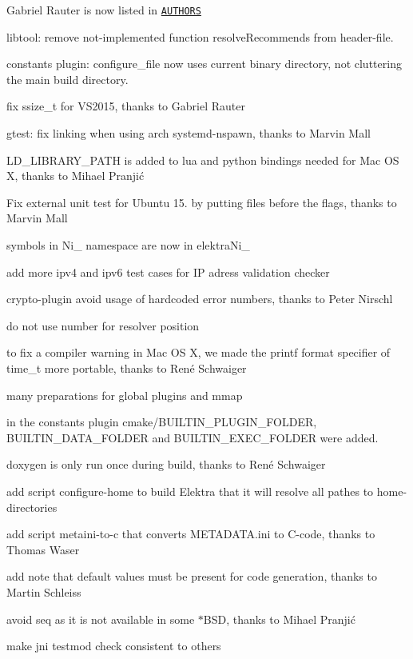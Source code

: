 \begin{DoxyItemize}
\item Gabriel Rauter is now listed in \href{https://github.com/elektrainitiative/libelektra/tree/doc/AUTHORS}{\tt A\+U\+T\+H\+O\+R\+S}
\item libtool\+: remove not-\/implemented function resolve\+Recommends from header-\/file.
\item constants plugin\+: configure\+\_\+file now uses current binary directory, not cluttering the main build directory.
\item fix ssize\+\_\+t for V\+S2015, thanks to Gabriel Rauter
\item gtest\+: fix linking when using arch systemd-\/nspawn, thanks to Marvin Mall
\item L\+D\+\_\+\+L\+I\+B\+R\+A\+R\+Y\+\_\+\+P\+A\+T\+H is added to lua and python bindings needed for Mac O\+S X, thanks to Mihael Pranjić
\item Fix external unit test for Ubuntu 15. by putting files before the flags, thanks to Marvin Mall
\item symbols in Ni\+\_\+ namespace are now in elektra\+Ni\+\_\+
\item add more ipv4 and ipv6 test cases for I\+P adress validation checker
\item crypto-\/plugin avoid usage of hardcoded error numbers, thanks to Peter Nirschl
\item do not use number for resolver position
\item to fix a compiler warning in Mac O\+S X, we made the printf format specifier of time\+\_\+t more portable, thanks to René Schwaiger
\item many preparations for global plugins and mmap
\item in the constants plugin cmake/\+B\+U\+I\+L\+T\+I\+N\+\_\+\+P\+L\+U\+G\+I\+N\+\_\+\+F\+O\+L\+D\+E\+R, B\+U\+I\+L\+T\+I\+N\+\_\+\+D\+A\+T\+A\+\_\+\+F\+O\+L\+D\+E\+R and B\+U\+I\+L\+T\+I\+N\+\_\+\+E\+X\+E\+C\+\_\+\+F\+O\+L\+D\+E\+R were added.
\item doxygen is only run once during build, thanks to René Schwaiger
\item add script configure-\/home to build Elektra that it will resolve all pathes to home-\/directories
\item add script metaini-\/to-\/c that converts M\+E\+T\+A\+D\+A\+T\+A.\+ini to C-\/code, thanks to Thomas Waser
\item add note that default values must be present for code generation, thanks to Martin Schleiss
\item avoid {\ttfamily seq} as it is not available in some {\ttfamily $\ast$\+B\+S\+D}, thanks to Mihael Pranjić
\item make jni testmod check consistent to others
\end{DoxyItemize}

